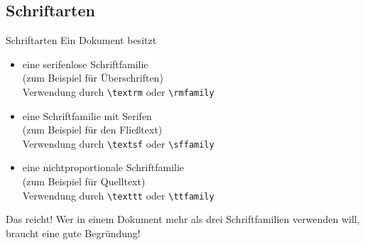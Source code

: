 
\subsection{Schriftarten}

\begin{Frame}[fragile]{Schriftarten}
  Ein Dokument besitzt
  \begin{itemize}
    \item eine serifenlose Schriftfamilie\\
      (zum Beispiel für Überschriften)\\
      Verwendung durch \lstinline-\textrm- oder \lstinline-\rmfamily-
    \item eine Schriftfamilie mit Serifen\\
      (zum Beispiel für den Fließtext)\\
      Verwendung durch \lstinline-\textsf- oder \lstinline-\sffamily-
    \item eine nichtproportionale Schriftfamilie\\
      (zum Beispiel für Quelltext)\\
      Verwendung durch \lstinline-\texttt- oder \lstinline-\ttfamily-
  \end{itemize}

  \begin{alertblock}{Das reicht!}
    Wer in einem Dokument \alert{mehr als drei Schriftfamilien} verwenden will,
    braucht eine \alert{gute Begründung}!
  \end{alertblock}
\end{Frame}


